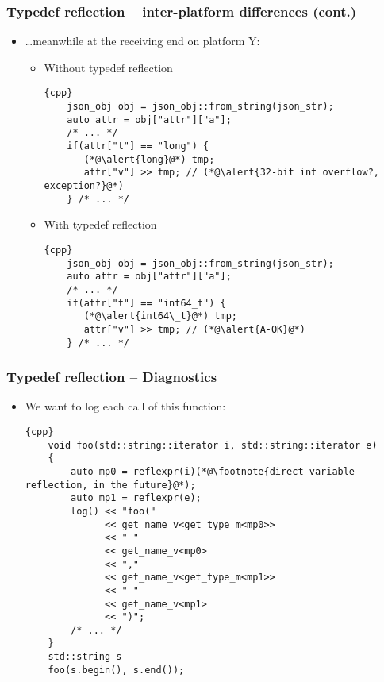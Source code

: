 \documentclass[compress,table,xcolor=table]{beamer}
\begin{document}
\begin{frame}[fragile]
\frametitle{Typedef reflection -- inter-platform differences (cont.)}
  \footnotesize
  \begin{itemize}
  \item \ldots meanwhile at the receiving end on platform Y:
    \begin{itemize}
    \item Without typedef reflection
      \begin{lstlisting}{cpp}
	json_obj obj = json_obj::from_string(json_str);
	auto attr = obj["attr"]["a"];
	/* ... */
	if(attr["t"] == "long") {
	   (*@\alert{long}@*) tmp;
	   attr["v"] >> tmp; // (*@\alert{32-bit int overflow?, exception?}@*)
	} /* ... */
      \end{lstlisting}
    \item With typedef reflection
      \begin{lstlisting}{cpp}
	json_obj obj = json_obj::from_string(json_str);
	auto attr = obj["attr"]["a"];
	/* ... */
	if(attr["t"] == "int64_t") {
	   (*@\alert{int64\_t}@*) tmp;
	   attr["v"] >> tmp; // (*@\alert{A-OK}@*)
	} /* ... */
      \end{lstlisting}
    \end{itemize}
  \end{itemize}
\end{frame}

\begin{frame}[fragile]
\frametitle{Typedef reflection -- Diagnostics}
  \footnotesize
  \begin{itemize}
  \item We want to log each call of this function:
    \begin{lstlisting}{cpp}
	void foo(std::string::iterator i, std::string::iterator e)
	{
	    auto mp0 = reflexpr(i)(*@\footnote{direct variable reflection, in the future}@*);
	    auto mp1 = reflexpr(e);
	    log() << "foo("
	          << get_name_v<get_type_m<mp0>>
	          << " "
	          << get_name_v<mp0>
	          << ","
	          << get_name_v<get_type_m<mp1>>
	          << " "
	          << get_name_v<mp1>
	          << ")";
	    /* ... */
	}
	std::string s
	foo(s.begin(), s.end());
    \end{lstlisting}
  \end{itemize}
\end{frame}
\end{document}
